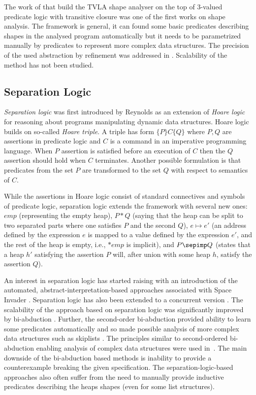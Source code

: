 	  The work of \cite{pale} that build the TVLA shape analyser on the top of 3-valued
	  predicate logic with transitive closure was one of the first works on shape analysis.
	  The framework is general, it can found some basic predicates describing shapes in the analysed
	  program automatically but it needs to be parametrized manually by predicates to
	  represent more complex data structures.
	  The precision of the used abstraction by refinement was addressed in \cite{cav05:mcpeak_necula, beyer:lazy_shape_analysis}.
	  Scalability of the method has not been studied.

	  \subsection{Separation Logic}

	  \emph{Separation logic} was first introduced by Reynolds \cite{Reynolds:SepLogic:02} as an extension
	  of \emph{Hoare logic} for reasoning about programs manipulating dynamic data structures.
	  Hoare logic builds on so-called \emph{Hoare triple}. A triple has form $\{P\}C\{Q\}$ where
	  $P,Q$ are assertions in predicate logic and $C$ is a command in an imperative programming language.
	  When $P$ assertion is satisfied before an execution of $C$ then the $Q$ assertion should hold
	  when $C$ terminates.
	  Another possible formulation is that predicates from the set $P$ are transformed to the set $Q$
	  with respect to semantics of $C$.

	  While the assertions in Hoare logic consist of standard connectives and symbols of predicate logic,
	  separation logic extends the framework with several new ones: $emp$ (representing
	  the empty heap), $P*Q$ (saying that the heap can be split to two separated parts where one satisfies $P$ and the second $Q$),
	  $e \mapsto e'$ (an address defined by the expression $e$ is mapped to a value defined
	  by the expression $e'$, and the rest of the heap is empty, i.e., $*emp$ is implicit),
	  and $P\sepimp Q$ (states that a heap $h'$ satisfying the assertion $P$ will, after union with some heap $h$,
	  satisfy the assertion $Q$).

	  An interest in separation logic has started raising with an introduction of the automated,
	  abstract-interpretation-based approaches associated with Space Invader \cite{InvaderCAV08}.
	  Separation logic has also been extended to a concurrent version \cite{brookes16}.
	  The scalability of the approach based on separation logic was significantly improved by bi-abduction \cite{abduction11}.
	  Further, the second-order bi-abduction provided ability to learn some predicates automatically and so made possible analysis
	  of more complex data structures such as skiplists \cite{locle:secondorder}.
	  The principles similar to second-ordered bi-abduction enabling analysis of complex data structures
	  were used in~\cite{indPrSynt07}.
	  The main downside of the bi-abduction based methods is inability to provide a counterexample breaking
	  the given specification.
	  The separation-logic-based approa\-ches also often suffer from the need to manually provide inductive predicates
	  describing the heaps shapes (even for some list structures).

